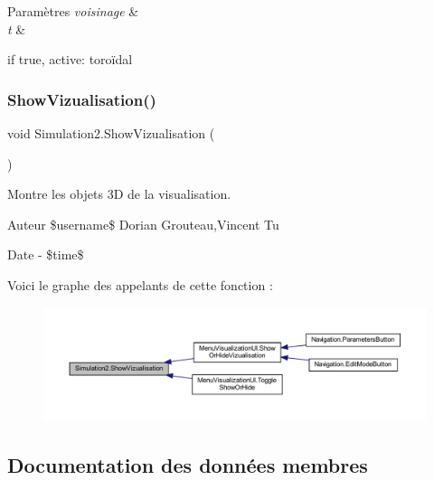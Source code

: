 \begin{DoxyParams}{Paramètres}
{\em voisinage} & \\
\hline
{\em t} & \\
\hline
\end{DoxyParams}
if true, active\+: toroïdal \mbox{\label{class_simulation2_a039dde8f4d11ff8998e438051166f8b2}} 
\subsubsection{\texorpdfstring{Show\+Vizualisation()}{ShowVizualisation()}}
{\footnotesize\ttfamily void Simulation2.\+Show\+Vizualisation (\begin{DoxyParamCaption}{ }\end{DoxyParamCaption})\hspace{0.3cm}{\ttfamily [inline]}}



Montre les objets 3D de la visualisation. 

\begin{DoxyAuthor}{Auteur}
\$username\$ Dorian Grouteau,Vincent Tu 
\end{DoxyAuthor}
\begin{DoxyDate}{Date}
-\/ \$time\$ 
\end{DoxyDate}
Voici le graphe des appelants de cette fonction \+:
\nopagebreak
\begin{figure}[H]
\begin{center}
\leavevmode
\includegraphics[width=350pt]{class_simulation2_a039dde8f4d11ff8998e438051166f8b2_icgraph}
\end{center}
\end{figure}


\subsection{Documentation des données membres}
\mbox{\label{class_simulation2_a4cb820ddd8658778f36723fa0e5dec50}} 
